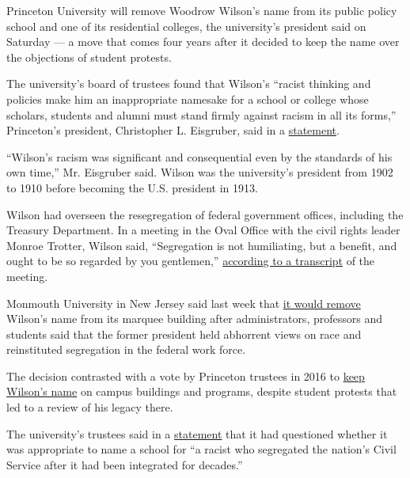 Princeton University will remove Woodrow Wilson's name from its public
policy school and one of its residential colleges, the university's
president said on Saturday --- a move that comes four years after it
decided to keep the name over the objections of student protests.

The university's board of trustees found that Wilson's ``racist thinking
and policies make him an inappropriate namesake for a school or college
whose scholars, students and alumni must stand firmly against racism in
all its forms,'' Princeton's president, Christopher L. Eisgruber, said
in a
\href{https://www.princeton.edu/news/2020/06/27/president-eisgrubers-message-community-removal-woodrow-wilson-name-public-policy}{statement}.

``Wilson's racism was significant and consequential even by the
standards of his own time,'' Mr. Eisgruber said. Wilson was the
university's president from 1902 to 1910 before becoming the U.S.
president in 1913.

Wilson had overseen the resegregation of federal government offices,
including the Treasury Department. In a meeting in the Oval Office with
the civil rights leader Monroe Trotter, Wilson said, ``Segregation is
not humiliating, but a benefit, and ought to be so regarded by you
gentlemen,'' \href{http://historymatters.gmu.edu/d/5719/}{according to a
transcript} of the meeting.

Monmouth University in New Jersey said last week that
\href{https://www.nytimes3xbfgragh.onion/2020/06/21/nyregion/monmouth-university-woodrow-wilson.html}{it
would remove} Wilson's name from its marquee building after
administrators, professors and students said that the former president
held abhorrent views on race and reinstituted segregation in the federal
work force.

The decision contrasted with a vote by Princeton trustees in 2016 to
\href{https://www.nytimes3xbfgragh.onion/2016/04/05/nyregion/princeton-board-votes-to-keep-woodrow-wilsons-name-on-campus-buildings.html}{keep
Wilson's name} on campus buildings and programs, despite student
protests that led to a review of his legacy there.

The university's trustees said in a
\href{https://www.princeton.edu/news/2020/06/27/board-trustees-decision-removing-woodrow-wilsons-name-public-policy-school-and}{statement}
that it had questioned whether it was appropriate to name a school for
``a racist who segregated the nation's Civil Service after it had been
integrated for decades.''


